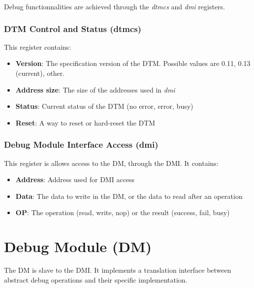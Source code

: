 \documentclass{article}
\begin{document}
	Debug functionnalities are achieved through the \textit{dtmcs} and \textit{dmi} registers.
	
	\subsubsection{DTM Control and Status (dtmcs)}
	
	This register contains:
	
	\begin{itemize}
	
	\item \textbf{Version}: The specification version of the DTM. Possible values are 0.11, 0.13 (current), other.
	
	\item \textbf{Address size}: The size of the addresses used in \textit{dmi}
	
	\item \textbf{Status}: Current status of the DTM (no error, error, busy)
	
	\item \textbf{Reset}: A way to reset or hard-reset the DTM
	
	\end{itemize}
	
	\subsubsection{Debug Module Interface Access (dmi)}
	
	This register is allows access to the DM, through the DMI. It contains:
	
	\begin{itemize}
	
	\item \textbf{Address}: Address used for DMI access
	
	\item \textbf{Data}: The data to write in the DM, or the data to read after an operation
	
	\item \textbf{OP}: The operation (read, write, nop) or the result (success, fail, busy)
	
	\end{itemize}
	
	\newpage
	\section{Debug Module (DM)}
	
	The DM is slave to the DMI. It implements a translation interface between abstract debug operations and their specific implementation.
	
\end{document}
